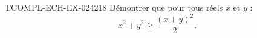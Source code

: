 \begin{exercice}{TCOMPL-ECH-EX-024}{2}{18}
Démontrer que pour tous réels $x$ et $y$ :
\[ x^2 + y^2 \geq \frac{(x+y)^2}{2}. \]

\end{exercice}
